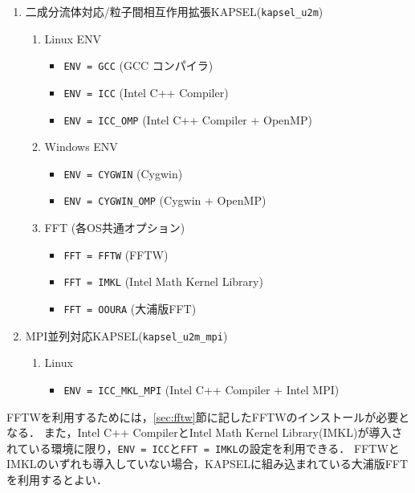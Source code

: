 \documentclass[pdflatex,a4paper,10pt,ja=standard]{bxjsarticle}
\begin{document}
\begin{enumerate}
    \item 二成分流体対応/粒子間相互作用拡張KAPSEL(\verb|kapsel_u2m|)
    \begin{enumerate}
        \item Linux ENV
        \begin{itemize}
        \item \verb|ENV = GCC| (GCC コンパイラ)
        \item \verb|ENV = ICC| (Intel C++ Compiler)
        \item \verb|ENV = ICC_OMP| (Intel C++ Compiler + OpenMP)
        \end{itemize}
        \item Windows ENV
        \begin{itemize}
        \item \verb|ENV = CYGWIN| (Cygwin)
        \item \verb|ENV = CYGWIN_OMP| (Cygwin + OpenMP)
        \end{itemize}
        \item FFT (各OS共通オプション)
        \begin{itemize}
            \item \verb|FFT = FFTW| (FFTW)
            \item \verb|FFT = IMKL| (Intel Math Kernel Library)
            \item \verb|FFT = OOURA| (大浦版FFT\autocite{ooura_fft})
        \end{itemize}
    \end{enumerate}

    \item MPI並列対応KAPSEL(\verb|kapsel_u2m_mpi|)
    \begin{enumerate}
        \item Linux
        \begin{itemize}
            \item \verb|ENV = ICC_MKL_MPI| (Intel C++ Compiler + Intel MPI)
        \end{itemize}
    \end{enumerate}
\end{enumerate}
FFTWを利用するためには，\ref{sec:fftw}節に記したFFTWのインストールが必要となる．
また，Intel C++ CompilerとIntel Math Kernel Library(IMKL)が導入されている環境に限り，\verb|ENV = ICC|と\verb|FFT = IMKL|の設定を利用できる．
FFTWとIMKLのいずれも導入していない場合，KAPSELに組み込まれている大浦版FFT\autocite{ooura_fft}を利用するとよい．
%
\end{document}
